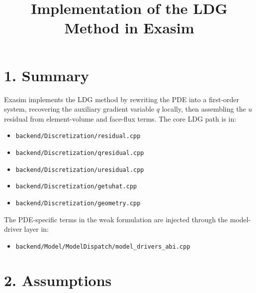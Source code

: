 \documentclass[11pt]{article}
\title{Implementation of the LDG Method in Exasim}
\author{}
\date{}
\begin{document}
\maketitle

\section*{1. Summary}

Exasim implements the LDG method by rewriting the PDE into a first-order
system, recovering the auxiliary gradient variable $q$ locally, then
assembling the $u$ residual from element-volume and face-flux terms. The
core LDG path is in:

\begin{itemize}[leftmargin=*]
\item \texttt{backend/Discretization/residual.cpp}
\item \texttt{backend/Discretization/qresidual.cpp}
\item \texttt{backend/Discretization/uresidual.cpp}
\item \texttt{backend/Discretization/getuhat.cpp}
\item \texttt{backend/Discretization/geometry.cpp}
\end{itemize}

The PDE-specific terms in the weak formulation are injected through the
model-driver layer in:

\begin{itemize}[leftmargin=*]
\item \texttt{backend/Model/ModelDispatch/model\_drivers\_abi.cpp}
\end{itemize}

\section*{2. Assumptions}
\end{document}
